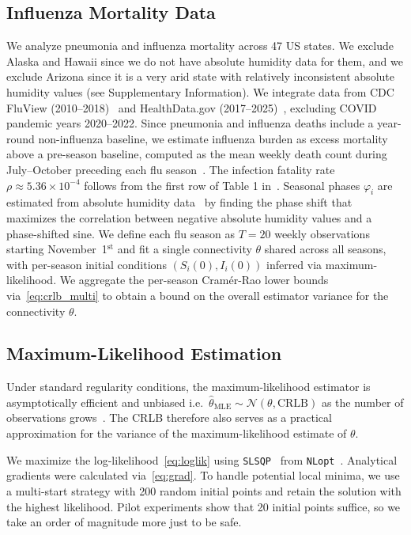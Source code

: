 \documentclass[9pt,twocolumn,twoside]{pnas-new}
\begin{document}
{\subsection*{Influenza Mortality Data}\label{subsec:real_data}
We analyze pneumonia and influenza mortality across 47 US states.  We
exclude Alaska and Hawaii since we do not have absolute humidity data
for them, and we exclude Arizona since it is a very arid state with
relatively inconsistent absolute humidity values (see Supplementary
Information). We integrate data from CDC FluView
(2010--2018)~\citep{cdcfluview2024} and HealthData.gov
(2017--2025)~\citep{healthdatagov2025}, excluding COVID pandemic years
2020--2022. Since pneumonia and influenza deaths include a year-round
non-influenza baseline, we estimate influenza burden as excess
mortality above a pre-season baseline, computed as the mean weekly
death count during July--October preceding each flu
season~\citep{serfling1963, viboud2006}. The infection fatality rate
$\rho \approx 5.36 \times 10^{-4}$ follows from the first row of Table
1 in~\citep{rolfes2018}. Seasonal phases $\varphi_i$ are estimated
from absolute humidity data~\citep{daon2025, shaman2009} by finding
the phase shift that maximizes the correlation between negative
absolute humidity values and a phase-shifted sine. We define each flu
season as $T = 20$ weekly observations starting
November~1$^{\text{st}}$ and fit a single connectivity $\theta$ shared
across all seasons, with per-season initial conditions $(S_i(0),
I_i(0))$ inferred via maximum-likelihood. We aggregate the per-season
Cram\'er-Rao lower bounds via~\eqref{eq:crlb_multi} to obtain a
bound on the overall estimator variance for the connectivity $\theta$.
 
\subsection*{Maximum-Likelihood Estimation}\label{subsec:mle}
Under standard regularity conditions, the maximum-likelihood estimator
is asymptotically efficient and unbiased i.e.~$\hat\theta_{\text{MLE}}
\sim \mathcal{N}(\theta, \text{CRLB})$ as the number of observations
grows~\citep{wilke2020, casella2024statistical}. The CRLB therefore
also serves as a practical approximation for the variance of the
maximum-likelihood estimate of $\theta$.

We maximize the log-likelihood~\eqref{eq:loglik} using
\texttt{SLSQP}~\citep{kraft1988, kraft1994} from
\texttt{NLopt}~\citep{NLopt}. Analytical gradients were calculated
via~\eqref{eq:grad}. To handle potential local minima, we use a
multi-start strategy with 200 random initial points and retain the
solution with the highest likelihood. Pilot experiments show that 20
initial points suffice, so we take an order of magnitude more just to
be safe.}
\end{document}
